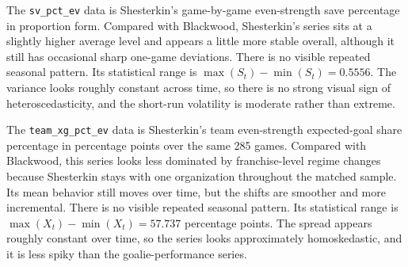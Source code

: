 \documentclass[
  10pt,
]{extarticle}
\begin{document}
The \texttt{sv\_pct\_ev} data is Shesterkin's game-by-game even-strength save percentage in proportion form. Compared with Blackwood, Shesterkin's series sits at a slightly higher average level and appears a little more stable overall, although it still has occasional sharp one-game deviations. There is no visible repeated seasonal pattern. Its statistical range is \(\max(S_t) - \min(S_t) = 0.5556\). The variance looks roughly constant across time, so there is no strong visual sign of heteroscedasticity, and the short-run volatility is moderate rather than extreme.

The \texttt{team\_xg\_pct\_ev} data is Shesterkin's team even-strength expected-goal share percentage in percentage points over the same 285 games. Compared with Blackwood, this series looks less dominated by franchise-level regime changes because Shesterkin stays with one organization throughout the matched sample. Its mean behavior still moves over time, but the shifts are smoother and more incremental. There is no visible repeated seasonal pattern. Its statistical range is \(\max(X_t) - \min(X_t) = 57.737\) percentage points. The spread appears roughly constant over time, so the series looks approximately homoskedastic, and it is less spiky than the goalie-performance series.
\end{document}
